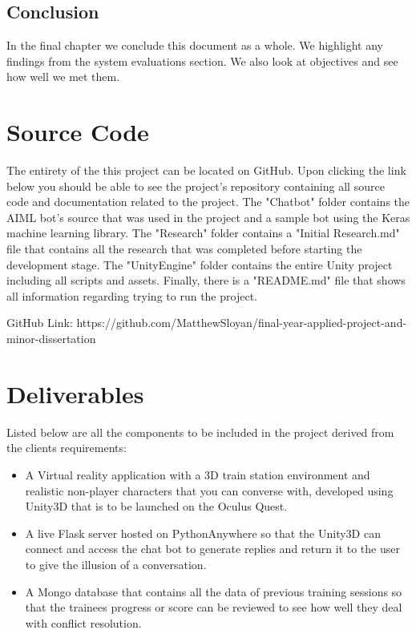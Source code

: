 \subsection{Conclusion}
In the final chapter we conclude this document as a whole. We highlight any findings from the system evaluations section. We also look at objectives and see how well we met them.

\section{Source Code}
The entirety of the this project can be located on GitHub. Upon clicking the link below you should be able to see the project's repository containing all source code and documentation related to the project. The "Chatbot" folder contains the AIML bot's source that was used in the project and a sample bot using the Keras machine learning library. The "Research" folder contains a "Initial Research.md" file that contains all the research that was completed before starting the development stage. The "UnityEngine" folder contains the entire Unity project including all scripts and assets. Finally, there is a "README.md" file that shows all information regarding trying to run the project.
\newline

GitHub Link: https://github.com/MatthewSloyan/final-year-applied-project-and-minor-dissertation

\section{Deliverables}
Listed below are all the components to be included in the project derived from the clients requirements:

\begin{itemize}
    \item A Virtual reality application with a 3D train station environment and realistic non-player characters that you can converse with, developed using Unity3D that is to be launched on the Oculus Quest.
    
    \item A live Flask server hosted on PythonAnywhere so that the Unity3D can connect and access the chat bot to generate replies and return it to the user to give the illusion of a conversation.
    
    \item A Mongo database that contains all the data of previous training sessions so that the trainees progress or score can be reviewed to see how well they deal with conflict resolution. 
\end{itemize}
\newpage
